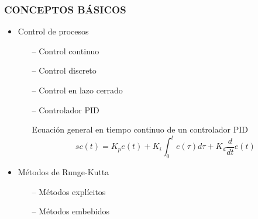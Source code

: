 \documentclass[usenames,xcolor={dvipsnames, table}]{beamer}
\begin{document}
\begin{frame}
	\frametitle{CONCEPTOS BÁSICOS}
	\vspace{20pt}

	\begin{itemize}
		\Large
		\setlength\itemsep{1em}
		\item Control de procesos
		\begin{itemize}
			\large
			\item[--] Control continuo
			\item[--] Control discreto
			\item[--] Control en lazo cerrado
			\item[--] Controlador PID
			\begin{block}{Ecuación general en tiempo continuo de un controlador PID}
				\begin{equation}
					sc(t) = K_{p}e(t)+  K_{i}\int_{0}^{t} e(\tau) d\tau + K_{d} \frac{d}{dt}e(t)
				\end{equation}
			\end{block}
		\end{itemize}
		\item Métodos de Runge-Kutta
		\begin{itemize}
			\large
			\item[--] Métodos explícitos
			\item[--] Métodos embebidos
		\end{itemize} 
	\end{itemize}
	
\end{frame}
\end{document}
